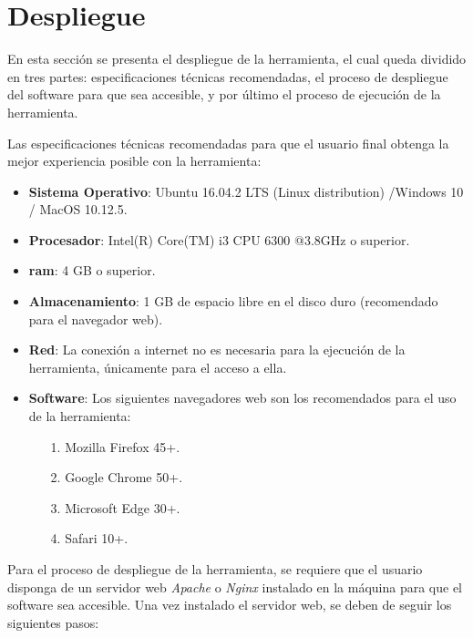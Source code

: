 \section{Despliegue}
\label{sec:deployment}

En esta sección se presenta el despliegue de la herramienta, el cual queda dividido en tres partes: especificaciones técnicas recomendadas, el proceso de despliegue del software para que sea accesible, y por último el proceso de ejecución de la herramienta.

Las especificaciones técnicas recomendadas para que el usuario final obtenga la mejor experiencia posible con la herramienta:

\begin{itemize}

\item \textbf{Sistema Operativo}: Ubuntu 16.04.2 LTS (Linux distribution) /Windows 10 / MacOS 10.12.5.

\item \textbf{Procesador}: Intel(R) Core(TM) i3 CPU 6300 @3.8GHz o superior.

\item \textbf{\gls{ram}}: 4 GB o superior.

\item \textbf{Almacenamiento}: 1 GB de espacio libre en el disco duro (recomendado para el navegador web).

\item \textbf{Red}: La conexión a internet no es necesaria para la ejecución de la herramienta, únicamente para el acceso a ella.

\item \textbf{Software}: Los siguientes navegadores web son los recomendados para el uso de la herramienta:

	\begin{itemize}

	\item[1.] Mozilla Firefox 45+.
	
	\item[2.] Google Chrome 50+.
	
	\item[3.] Microsoft Edge 30+.
	
	\item[4.] Safari 10+.

	\end{itemize}

\end{itemize}

Para el proceso de despliegue de la herramienta, se requiere que el usuario disponga de un servidor web \textit{Apache}  o \textit{Nginx} instalado en la máquina para que el software sea accesible. Una vez instalado el servidor web, se deben de seguir los siguientes pasos:

